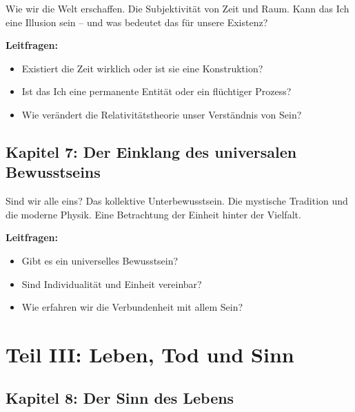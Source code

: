 Wie wir die Welt erschaffen. Die Subjektivität von Zeit und Raum. Kann das Ich eine Illusion sein – und was bedeutet das für unsere Existenz?

\textbf{Leitfragen:}
\begin{itemize}
	\item Existiert die Zeit wirklich oder ist sie eine Konstruktion?
	\item Ist das Ich eine permanente Entität oder ein flüchtiger Prozess?
	\item Wie verändert die Relativitätstheorie unser Verständnis von Sein?
\end{itemize}

\section*{Kapitel 7: Der Einklang des universalen Bewusstseins}

Sind wir alle eins? Das kollektive Unterbewusstsein. Die mystische Tradition und die moderne Physik. Eine Betrachtung der Einheit hinter der Vielfalt.

\textbf{Leitfragen:}
\begin{itemize}
	\item Gibt es ein universelles Bewusstsein?
	\item Sind Individualität und Einheit vereinbar?
	\item Wie erfahren wir die Verbundenheit mit allem Sein?
\end{itemize}


\chapter{Teil III: Leben, Tod und Sinn}

\section*{Kapitel 8: Der Sinn des Lebens}

